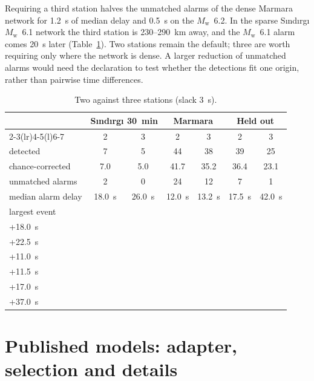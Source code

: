 \documentclass[11pt,a4paper]{article}
\newcommand{\Mw}{$M_\mathrm{w}$}
\begin{document}
Requiring a third station halves the unmatched alarms of the dense Marmara
network for 1.2~s of median delay and 0.5~s on the \Mw{}~6.2. In the sparse
S\i{}nd\i{}rg\i{} \Mw{}~6.1 network the third station is 230--290~km away, and the \Mw{}~6.1 alarm
comes 20~s later (Table~\ref{t:minstations}). Two stations remain the default;
three are worth requiring only where the network is dense. A larger reduction
of unmatched alarms would need the declaration to test whether the detections
fit one origin, rather than pairwise time differences.

\begin{table}[htbp]
  \centering\small
  \caption{Two against three stations (slack 3~s).}\label{t:minstations}
  \begin{tabular}{@{}lcccccc@{}}
    \toprule
    & \multicolumn{2}{c}{S\i{}nd\i{}rg\i{} 30~min} & \multicolumn{2}{c}{Marmara} & \multicolumn{2}{c}{Held out} \\
    \cmidrule(lr){2-3}\cmidrule(lr){4-5}\cmidrule(l){6-7}
    & 2 & 3 & 2 & 3 & 2 & 3 \\
    \midrule
    detected & 7 & 5 & 44 & 38 & 39 & 25 \\
    chance-corrected & 7.0 & 5.0 & 41.7 & 35.2 & 36.4 & 23.1 \\
    unmatched alarms & 2 & 0 & 24 & 12 & 7 & 1 \\
    median alarm delay & 18.0~s & 26.0~s & 12.0~s & 13.2~s & 17.5~s & 42.0~s \\
    largest event & \makecell{\Mw{}~4.9\\+18.0~s} & \makecell{\Mw{}~4.9\\+22.5~s}
    & \makecell{\Mw{}~6.2\\+11.0~s} & \makecell{\Mw{}~6.2\\+11.5~s}
    & \makecell{\Mw{}~6.1\\+17.0~s} & \makecell{\Mw{}~6.1\\+37.0~s} \\
    \bottomrule
  \end{tabular}
\end{table}

\clearpage
\section{Published models: adapter, selection and details}\label{s:seisbench}
\end{document}
